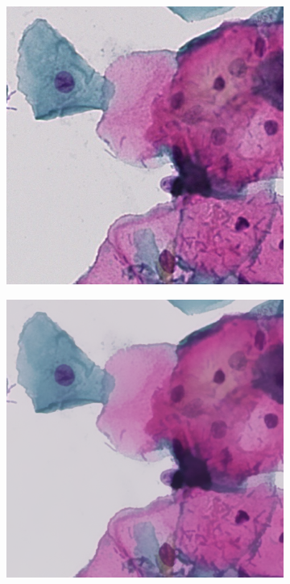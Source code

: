 \documentclass [12pt,a4paper]{report}
\begin{document}
\begin{center}
\begin{figure}[h]
\begin{subfigure}{.5\textwidth}
  \centering
  \includegraphics[scale=0.3]{microscope.eps} %
\end{subfigure}%
\begin{subfigure}{.5\textwidth}
  \centering
  \includegraphics[scale=0.3]{microscope_bf_10_10.eps} %

\end{subfigure}
\end{figure}
\end{center}
\end{document}
